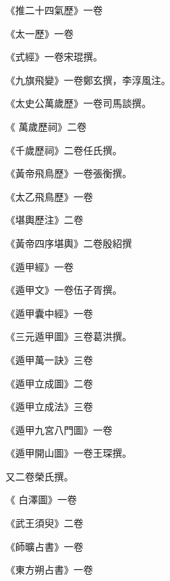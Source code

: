 \begin{pinyinscope}
 《推二十四氣歷》一卷



 《太一歷》一卷



 《式經》一卷宋琨撰。



 《九旗飛變》一卷鄭玄撰，李淳風注。



 《太史公萬歲歷》一卷司馬談撰。



 《
 萬歲歷祠》二卷



 《千歲歷祠》二卷任氏撰。



 《黃帝飛鳥歷》一卷張衡撰。



 《太乙飛鳥歷》一卷



 《堪輿歷注》二卷



 《黃帝四序堪輿》二卷殷紹撰



 《遁甲經》一卷



 《遁甲文》一卷伍子胥撰。



 《遁甲囊中經》一卷



 《三元遁甲圖》三卷葛洪撰。



 《遁甲萬一訣》三卷



 《遁甲立成圖》二卷



 《遁甲立成法》三卷



 《遁甲九宮八門圖》一卷



 《遁甲開山圖》一卷王琛撰。



 又二卷榮氏撰。



 《
 白澤圖》一卷



 《武王須臾》二卷



 《師曠占書》一卷



 《東方朔占書》一卷




\end{pinyinscope}
